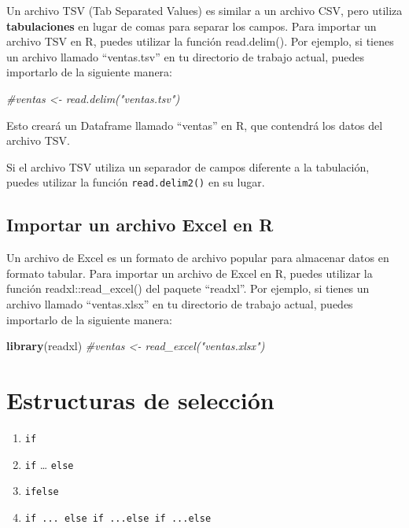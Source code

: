\documentclass[
]{book}
\newenvironment{Shaded}{\begin{snugshade}}{\end{snugshade}}
\newcommand{\CommentTok}[1]{\textcolor[rgb]{0.56,0.35,0.01}{\textit{#1}}}
\newcommand{\FunctionTok}[1]{\textcolor[rgb]{0.13,0.29,0.53}{\textbf{#1}}}
\newcommand{\NormalTok}[1]{#1}
\providecommand{\tightlist}{%
  \setlength{\itemsep}{0pt}\setlength{\parskip}{0pt}}
\begin{document}
Un archivo TSV (Tab Separated Values) es similar a un archivo CSV, pero utiliza \textbf{tabulaciones} en lugar de comas para separar los campos. Para importar un archivo TSV en R, puedes utilizar la función read.delim(). Por ejemplo, si tienes un archivo llamado ``ventas.tsv'' en tu directorio de trabajo actual, puedes importarlo de la siguiente manera:

\begin{Shaded}
\begin{Highlighting}[]
\CommentTok{\#ventas \textless{}{-} read.delim("ventas.tsv")}
\end{Highlighting}
\end{Shaded}

Esto creará un Dataframe llamado ``ventas'' en R, que contendrá los datos del archivo TSV.

Si el archivo TSV utiliza un separador de campos diferente a la tabulación, puedes utilizar la función \texttt{read.delim2()} en su lugar.

\hypertarget{importar-un-archivo-excel-en-r}{%
\section{Importar un archivo Excel en R}\label{importar-un-archivo-excel-en-r}}

Un archivo de Excel es un formato de archivo popular para almacenar datos en formato tabular. Para importar un archivo de Excel en R, puedes utilizar la función readxl::read\_excel() del paquete ``readxl''. Por ejemplo, si tienes un archivo llamado ``ventas.xlsx'' en tu directorio de trabajo actual, puedes importarlo de la siguiente manera:

\begin{Shaded}
\begin{Highlighting}[]
\FunctionTok{library}\NormalTok{(readxl)}
\CommentTok{\#ventas \textless{}{-} read\_excel("ventas.xlsx")}
\end{Highlighting}
\end{Shaded}

\hypertarget{Estructuras_de_seleccion}{%
\chapter{Estructuras de selección}\label{Estructuras_de_seleccion}}

\begin{enumerate}
\def\labelenumi{\arabic{enumi}.}
\tightlist
\item
  \texttt{if}
\item
  \texttt{if} \ldots{} \texttt{else}
\item
  \texttt{ifelse}
\item
  \texttt{if\ ...\ else\ if\ ...else\ if\ ...else}
\end{enumerate}
\end{document}
